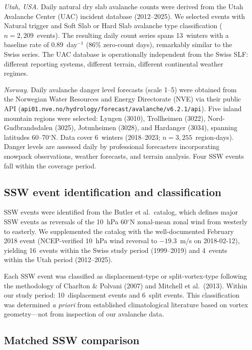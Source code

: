 \documentclass[11pt,letterpaper]{article}
\begin{document}
\textit{Utah, USA.} Daily natural dry slab avalanche counts were derived from the Utah Avalanche Center (UAC) incident database (2012--2025). We selected events with Natural trigger and Soft Slab or Hard Slab avalanche type classification ($n = 2{,}209$~events). The resulting daily count series spans 13~winters with a baseline rate of 0.89~day$^{-1}$ (86\% zero-count days), remarkably similar to the Swiss series. The UAC database is operationally independent from the Swiss SLF: different reporting systems, different terrain, different continental weather regimes.

\textit{Norway.} Daily avalanche danger level forecasts (scale 1--5) were obtained from the Norwegian Water Resources and Energy Directorate (NVE) via their public API (\texttt{api01.nve.no/hydrology/forecast/avalanche/v6.2.1/api}). Five inland mountain regions were selected: Lyngen (3010), Trollheimen (3022), Nord-Gudbrandsdalen (3025), Jotunheimen (3028), and Hardanger (3034), spanning latitudes 60--70$^\circ$N. Data cover 6~winters (2018--2023; $n = 3{,}255$~region-days). Danger levels are assessed daily by professional forecasters incorporating snowpack observations, weather forecasts, and terrain analysis. Four SSW events fall within the coverage period.

\subsection{SSW event identification and classification}

SSW events were identified from the Butler et al.\ catalog, which defines major SSW events as reversals of the 10~hPa 60$^\circ$N zonal-mean zonal wind from westerly to easterly. We supplemented the catalog with the well-documented February 2018 event (NCEP-verified 10~hPa wind reversal to $-19.3$~m/s on 2018-02-12), yielding 16~events within the Swiss study period (1999--2019) and 4~events within the Utah period (2012--2025).

Each SSW event was classified as displacement-type or split-vortex-type following the methodology of Charlton \& Polvani (2007) and Mitchell et al.\ (2013). Within our study period: 10~displacement events and 6~split events. This classification was determined \textit{a priori} from established climatological literature based on vortex geometry---not from inspection of our avalanche data.

\subsection{Matched SSW comparison}
\end{document}
